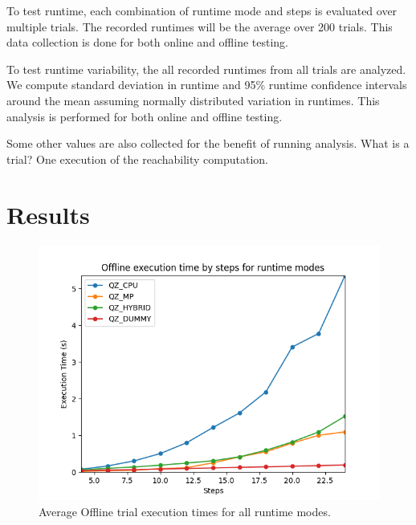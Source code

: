 \documentclass[runningheads]{llncs}
\begin{document}
To test runtime, each combination of runtime mode and steps is evaluated over multiple trials. The recorded runtimes will be the average over 200 trials. This data collection is done for both online and offline testing.

To test runtime variability, the all recorded runtimes from all trials are analyzed. We compute standard deviation in runtime and 95\% runtime confidence intervals around the mean assuming normally distributed variation in runtimes. This analysis is performed for both online and offline testing.

Some other values are also collected for the benefit of running analysis. 
What is a trial? One execution of the reachability computation.  


\section{Results}

\begin{figure}[H]
\includegraphics[width=\textwidth]{profiler_out/offline_avg_unified.png}
\caption{Average Offline trial execution times for all runtime modes.} \label{offline_avg}
\end{figure}
\end{document}

